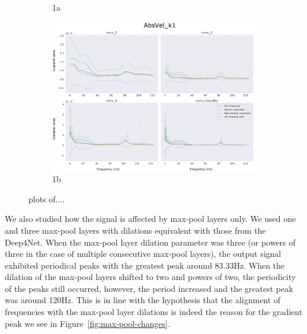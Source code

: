 \begin{figure}
\begin{subfigure}{.5\textwidth}
  \caption{1a}
  \label{fig:absVel-k2-d3}
\end{subfigure}%
\begin{subfigure}{.5\textwidth}
  \centering
  \includegraphics[width=.8\linewidth]{img/ch4/absVel-k1}
  \caption{1b}
  \label{fig:absVel-k1}
\end{subfigure}
\caption{plots of....}
\label{fig:gradient-peak}
\end{figure}

We also studied how the signal is affected by max-pool layers only.
We used one and three max-pool layers with dilations equivalent with those from the Deep4Net.
When the max-pool layer dilation parameter was three (or powers of three in the case of multiple consecutive max-pool layers), the output signal exhibited periodical peaks with the greatest peak around 83.33Hz.
When the dilation of the max-pool layers shifted to two and powers of two, the periodicity of the peaks still occurred, however, the period increased and the greatest peak was around 120Hz.
This is in line with the hypothesis that the alignment of frequencies with the max-pool layer dilations is indeed the reason for the gradient peak we see in Figure~\ref{fig:max-pool-changes}.


